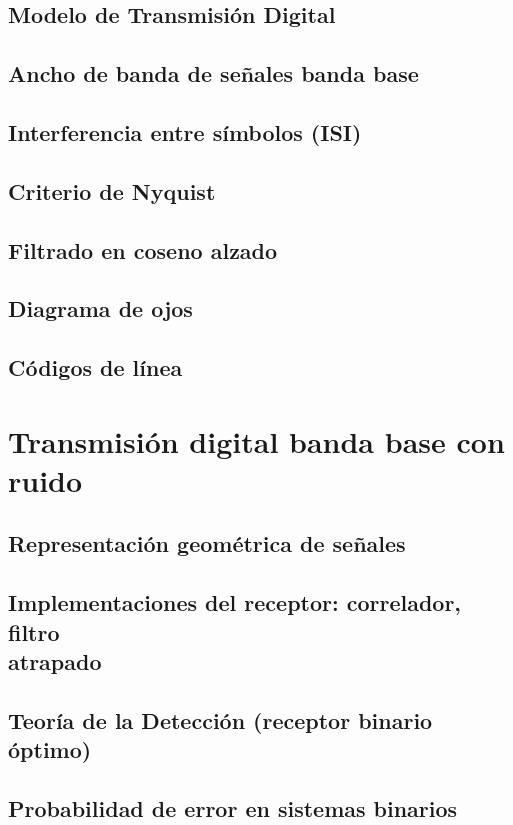 \documentclass[a4paper]{book}
\begin{document}
\section{Modelo de Transmisión Digital}
\section{Ancho de banda de señales banda base}
\section{Interferencia entre símbolos (ISI)}
\section{Criterio de Nyquist}
\section{Filtrado en coseno alzado}
\section{Diagrama de ojos}
\section{Códigos de línea}

\chapter{Transmisión digital banda base con ruido}
\section{Representación geométrica de señales}
\section{\texorpdfstring{Implementaciones del receptor: correlador, filtro\\ atrapado}{Implementaciones del receptor: correlador, filtro atrapado}}
\section{Teoría de la Detección (receptor binario óptimo)}
\section{Probabilidad de error en sistemas binarios}
\end{document}
